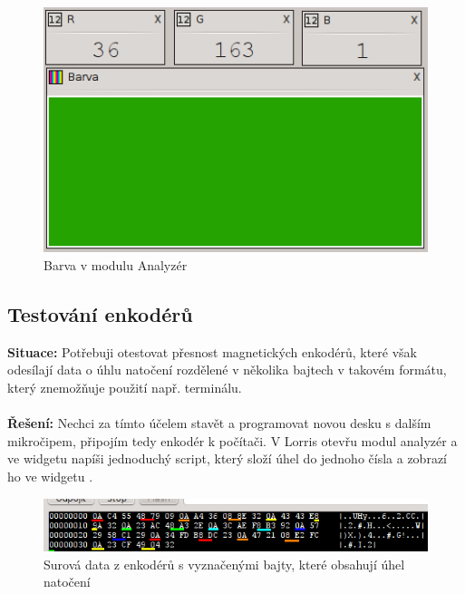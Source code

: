 \documentclass[12pt, a4paper, oneside]{article}
\begin{document}
\begin{figure}[h]
\begin{center}
\includegraphics{img/use_color.png}
\caption{Barva v modulu Analyzér}
\label{Terminal}
\end{center}
\end{figure}

\newpage
\subsection{Testování enkodérů}
{\bf Situace:} Potřebuji otestovat přesnost magnetických enkodérů, které však odesílají data o úhlu natočení rozdělené v několika bajtech v takovém formátu, který znemožňuje použití např. terminálu.\\
\\
{\bf Řešení:} Nechci za tímto účelem stavět a programovat novou desku s dalším mikročipem, připojím tedy enkodér k počítači. V Lorris otevřu modul analyzér a ve widgetu  napíši  jednoduchý script, který složí úhel do jednoho čísla a zobrazí ho ve widgetu .

\begin{figure}[H]
\begin{center}
\includegraphics{img/use_enc_term.png}
\caption{Surová data z enkodérů s vyznačenými bajty, které obsahují úhel natočení}
\label{Terminal}
\end{center}
\end{figure}
\end{document}
